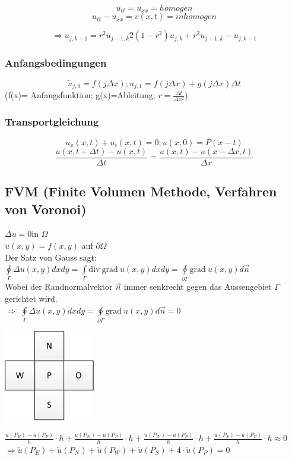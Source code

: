 $$u_{tt}=u_{xx} = homogen$$
$$u_{tt} -u_{xx}= v(x,t) = inhomogen$$

$$\Longrightarrow u_{j,k+1}=r^2 u_{j-1,k} 2(1-r^2)u_{j,k}+ r^2
u_{j+1,k}-u_{j,k-1}$$
\subsubsection{Anfangsbedingungen}
$$\tilde{u}_{j,0} = f(j\Delta x); u_{j,1}= f(j\Delta x) + g(j\Delta x)\Delta t$$
(f(x)= Anfangsfunktion; g(x)=Ableitung; $r = \frac{\Delta t}{\Delta x^2}$)

\subsubsection{Transportgleichung}
$$u_x(x,t) + u_t(x, t) = 0; u(x,0)=P(x-t)$$
$$\frac{u(x,t+\Delta t)-u(x,t)}{\Delta t} = \frac{u(x,t) - u(x-\Delta x,
t)}{\Delta x}$$

\subsection{FVM (Finite Volumen Methode, Verfahren von Voronoi)}
$\Delta u=0$\qquad in \quad$\Omega$\\
$u(x,y)=f(x,y)$ \qquad auf \quad$\partial\Omega$\\
Der Satz von Gauss sagt: $\boxed{\oint\limits_{\Gamma}{\Delta u(x,y) dx dy}=\int\limits_{\Gamma}{\mathrm{div}~\mathrm{grad}~ u(x,y) dx dy}=\oint\limits_{\partial\Gamma}{\mathrm{grad}~ u(x,y) d\vec{n}}}$\\


Wobei der Randnormalvektor $\vec{n}$ immer senkrecht gegen das Aussengebiet $\Gamma$ gerichtet wird.\\

$\Rightarrow$ $\oint\limits_{\Gamma}{\Delta u(x,y) dx dy}=\oint\limits_{\partial\Gamma}{\mathrm{grad}~ u(x,y) d\vec{n}}=0$

\begin{minipage}{4cm}
	\includegraphics[width=4cm]{Content/Numerik/FVMPrinzip.png}
\end{minipage}
\hfill
\begin{minipage}{14cm}
	$\frac{u(P_E)-u(P_P)}{h}\cdot h+\frac{u(P_N)-u(P_P)}{h}\cdot h+\frac{u(P_W)-u(P_P)}{h}\cdot h+\frac{u(P_S)-u(P_P)}{h}\cdot h\approx 0$\\
	
	$\Rightarrow\tilde{u}(P_E)+\tilde{u}(P_N)+\tilde{u}(P_W)+\tilde{u}(P_S)+4\cdot\tilde{u}(P_P)=0$
\end{minipage}

